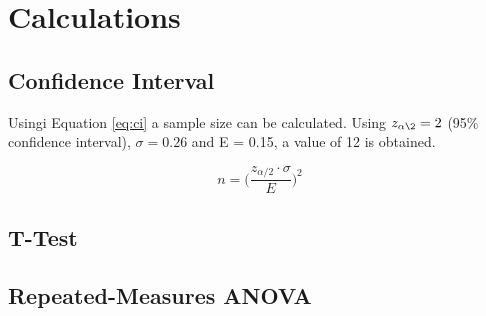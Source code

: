 \documentclass[a4paper]{article}
\begin{document}

\section{Calculations} %
\label{sec:calculations}

\subsection{Confidence Interval} %
\label{sub:confidence_interval}

Usingi Equation \ref{eq:ci} a sample size can be calculated. Using
$z_{\alpha\2} = 2$ (95\% confidence interval), $\sigma = 0.26$  and E = 0.15,
a value of 12 is obtained.

\begin{equation}
  n = \Big( \frac{z_{\alpha/2} \cdot \sigma}{E} \Big)^2
  \label{eq:ci}
\end{equation}


\subsection{T-Test} %
\label{sub:t_test}


\subsection{Repeated-Measures ANOVA} %
\label{sub:repeated_measures_anova}



\custombibliography
\end{document}
